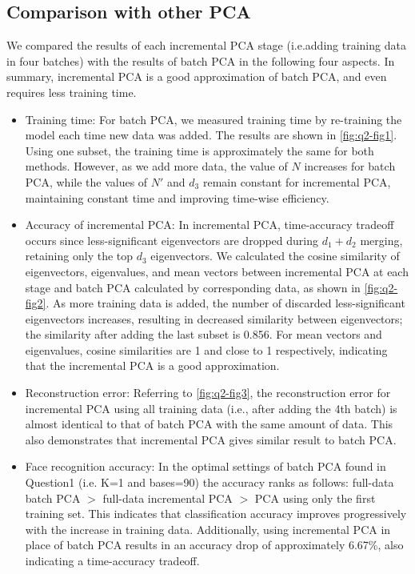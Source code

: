 \subsection{Comparison with other PCA}
We compared the results of each incremental PCA stage (i.e.adding training data in four batches) with the results of batch PCA in the following four aspects. In summary, incremental PCA is a good approximation of batch PCA, and even requires less training time.
\begin{itemize}
	\item Training time: For batch PCA, we measured training time by re-training the model each time new data was added. The results are shown in \cref{fig:q2-fig1}. Using one subset, the training time is approximately the same for both methods. However, as we add more data, the value of $N$ increases for batch PCA, while the values of $N'$ and $d_3$ remain constant for incremental PCA, maintaining constant time and improving time-wise efficiency.
	
	\item Accuracy of incremental PCA: In incremental PCA, time-accuracy tradeoff occurs since less-significant eigenvectors are dropped during $d_1 + d_2$ merging, retaining only the top $d_3$ eigenvectors. We calculated the cosine similarity of eigenvectors, eigenvalues, and mean vectors between incremental PCA at each stage and batch PCA calculated by corresponding data, as shown in \cref{fig:q2-fig2}. As more training data is added, the number of discarded less-significant eigenvectors increases, resulting in decreased similarity between eigenvectors; the similarity after adding the last subset is 0.856. For mean vectors and eigenvalues, cosine similarities are 1 and close to 1 respectively, indicating that the incremental PCA is a good approximation.
	
	\item Reconstruction error: Referring to \cref{fig:q2-fig3}, the reconstruction error for incremental PCA using all training data (i.e., after adding the 4th batch) is almost identical to that of batch PCA with the same amount of data. This also demonstrates that incremental PCA gives similar result to batch PCA.
	
	\item Face recognition accuracy: In the optimal settings of batch PCA found in Question1 (i.e. K=1 and bases=90) the accuracy ranks as follows: full-data batch PCA $>$ full-data incremental PCA $>$ PCA using only the first training set. This indicates that classification accuracy improves progressively with the increase in training data. Additionally, using incremental PCA in place of batch PCA results in an accuracy drop of approximately 6.67\%, also indicating a time-accuracy tradeoff.
	
\end{itemize}

